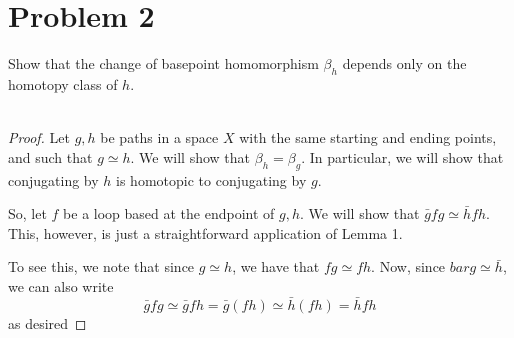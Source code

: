 \documentclass[fontsize=11pt]{scrartcl} %
\numberwithin{equation}{section} %
\numberwithin{figure}{section} %
\numberwithin{table}{section} %
\begin{document}
\section*{Problem 2}
Show that the change of basepoint homomorphism $\beta_h$ depends only on the
homotopy class of $h$.
\\
\\
\begin{proof}
    Let $g,h$ be paths in a space $X$ with the same starting and ending points,
    and such that $g\simeq h$. We will show that $\beta_h=\beta_g$. In
    particular, we will show that conjugating by $h$ is homotopic to conjugating
    by $g$.

    So, let $f$ be a loop based at the endpoint of $g,h$. We will show that
    $\bar{g}fg \simeq \bar{h}fh$. This, however, is just a straightforward
    application of Lemma 1.
    
    To see this, we note that since $g\simeq h$, we have that $fg\simeq fh$.
    Now, since $bar{g}\simeq \bar{h}$, we can also write
    \[
        \bar{g}fg\simeq \bar{g}fh = \bar{g}(fh)\simeq \bar{h}(fh) = \bar{h}fh
    \]
    as desired
\end{proof}

\newpage
\end{document}
